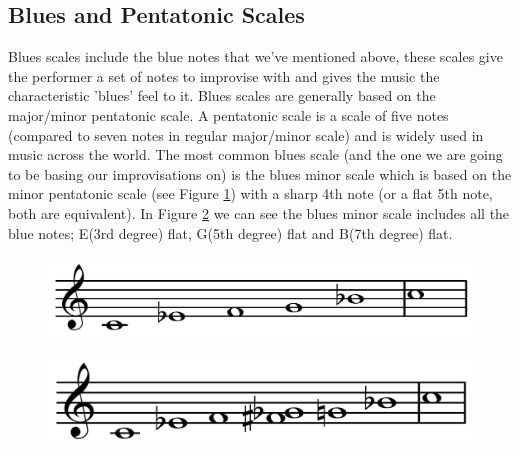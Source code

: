 \documentclass[pdftex,12pt,a4paper]{report}
\begin{document}
\subsection{Blues and Pentatonic Scales}
Blues scales include the blue notes that we've mentioned above, these scales give the performer a set of notes to improvise with and gives the music the characteristic 'blues' feel to it. Blues scales are generally based on the major/minor pentatonic scale. A pentatonic scale is a scale of five notes (compared to seven notes in regular major/minor scale) and is widely used in music across the world. The most common blues scale (and the one we are going to be basing our improvisations on) is the blues minor scale which is based on the minor pentatonic scale (see Figure \ref{fig:cminorpentatonicscale}) with a sharp 4th note (or a flat 5th note, both are equivalent). In Figure \ref{fig:cminorbluesscale} we can see the blues minor scale includes all the blue notes; E(3rd degree) flat, G(5th degree) flat and B(7th degree) flat.


\begin{figure}[here]
  \centering
  \includegraphics[scale=0.3]{figure/minorpentatonicscale.png}
  \label{fig:cminorpentatonicscale}
\end{figure}

\begin{figure}[here]
  \centering
  \includegraphics[scale=0.3]{figure/bluesminorhexatonicscale.png}
  \label{fig:cminorbluesscale}
\end{figure}
\end{document}
